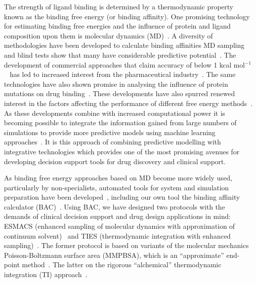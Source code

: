 The strength of ligand binding is determined by a thermodynamic property known
as the binding free energy (or binding affinity). 
One promising technology for
estimating binding free energies and the influence of protein and ligand
composition upon them is molecular dynamics (MD)~\cite{Karplus2005}. 
A diversity of methodologies have been developed to calculate binding affinities
MD sampling~\cite{Mobley2012} and blind tests show that many have considerable
predictive potential~\cite{Mey2017, Yin2017}.
The development of commercial approaches that claim accuracy of below 1 
kcal mol$^{-1}$~\cite{Wang2015} has led to increased interest from the 
pharmaceutical industry~\cite{Ganesan2017}.
The same technologies have also shown promise in analysing the influence of 
protein mutations on drug binding~\cite{Mondal2016, Bunney2015}.
These developments have also spurred renewed interest in the factors affecting 
the performance of different free energy 
methods~\cite{Aldeghi2017, Cappel2016, Ruiter2016}.
As these developments combine with increased computational power it is becoming 
possible to integrate the information gained from large numbers of simulations 
to provide more predictive models using machine learning approaches~\cite{Ash2017}.
It is this approach of combining predictive modelling with integrative technologies 
which provides one of the most promising avenues for developing decision support 
tools for drug discovery and clinical support.

As binding free energy approaches based on MD become more widely used, particularly by 
non-specialists, automated tools for system and simulation preparation 
have been developed~\cite{Gapsys2015, Doerr2016, Rizzi}, including our own tool 
the binding affinity calculator (BAC)~\cite{Sadiq2008}.
Using BAC, we have designed two protocols
with the demands of clinical decision support and drug design applications in
mind: ESMACS (enhanced sampling of molecular dynamics with approximation of
continuum solvent)~\cite{Wan2017brd4} and TIES (thermodynamic integration with
enhanced sampling)~\cite{Bhati2017}. 
The former protocol is based on variants
of the molecular mechanics Poisson-Boltzmann surface area (MMPBSA), which is
an ``approximate'' end-point method~\cite{Massova1999}. 
The latter on the rigorous ``alchemical'' thermodynamic integration (TI)
approach~\cite{Straatsma1988}. 

